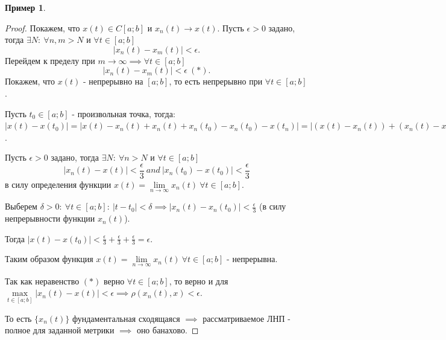 \documentclass{report}
\theoremstyle{definition}
\newtheorem{example}{Пример}
\begin{document}
\begin{example}
\begin{enumerate}
\begin{proof}
            Покажем, что $x(t) \in C[a;b]$ и $x_n(t) \rightarrow x(t)$. Пусть $\epsilon > 0$ задано, тогда
            $\exists N: \ \forall n,m > N$ и $\forall t \in [a;b]$
            \begin{equation*}
              |x_n(t) - x_m(t)| < \epsilon.
            \end{equation*}
            Перейдем к пределу при $m \rightarrow \infty \implies \forall t \in [a;b]$
            \begin{equation*}
              |x_n(t) - x_m(t)| < \epsilon \ (*).
            \end{equation*}
            Покажем, что $x(t)$ - непрерывно на $[a;b]$, то есть непрерывно при $\forall t \in [a;b]$.

            Пусть $t_0 \in [a;b]$ - произвольная точка, тогда: $|x(t) - x(t_0)| = |x(t) - x_n(t) + x_n(t) + x_n(t_0)-
              x_n(t_0) - x(t_n)| = |(x(t) - x_n(t)) + (x_n(t) - x_n(t_0)) + (x_n(t_0) - x(t_0))| \leqslant |x_n(t) - x(t)|
              + |x_n(t) - x_n(t_0)| + | x_n(t_0) - x(t_0) |$.

            Пусть $\epsilon > 0$ задано, тогда $\exists N : \ \forall n > N$ и $\forall t \in [a;b]$
            \begin{equation*}
              | x_n(t) - x(t) | < \frac{\epsilon}{3} \ and \ | x_n(t_0) - x(t_0) | < \frac{\epsilon}{3}
            \end{equation*}
            в силу определения функции $x(t) = \underset{n\rightarrow\infty}{\lim}x_n(t) \ \forall t \in [a;b]$.

            Выберем $\delta > 0 : \ \forall t \in [a;b]: \ | t-t_0 | < \delta \implies |x_n(t) - x_n(t_0)| < \frac
              {\epsilon}{3}$ (в силу непрерывности функции $x_n(t)$).

            Тогда $| x(t) - x(t_0) | < \frac{\epsilon}{3} + \frac{\epsilon}{3} + \frac{\epsilon}{3} = \epsilon$.

            Таким образом функция $x(t) = \underset{n \rightarrow \infty}{\lim}x_n(t) \ \forall t \in [a;b]$ - непрерывна.

            Так как неравенство $(*)$ верно $\forall t \in [a;b]$, то верно и для $\underset{t\in[a;b]}{\max}
              | x_n(t) - x(t) | < \epsilon \implies \rho(x_n(t), x) < \epsilon$.

            То есть $\{x_n(t)\}$ фундаментальная сходящаяся $\implies$ рассматриваемое ЛНП - полное для заданной метрики
            $\implies$ оно банахово.
          \end{proof}


\end{enumerate}
\end{example}
\end{document}

